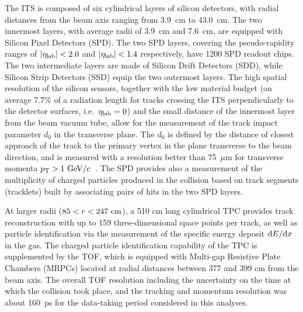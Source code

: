The ITS is composed of six cylindrical layers of silicon detectors, with radial distances from the beam axis ranging from 3.9~cm to 43.0~cm. 
The two innermost layers, with average radii of 3.9~cm and 7.6~cm, are equipped with Silicon Pixel Detectors (SPD). 
The two SPD layers, covering the pseudo-rapidity ranges of $|\eta_{\rm lab}|< 2.0$ and $|\eta_{\rm lab}|< 1.4$ respectively, have 1200 SPD readout chips.  
The two intermediate layers are made of Silicon Drift Detectors (SDD), while Silicon Strip Detectors (SSD) equip the two outermost layers. 
The high spatial resolution of the silicon sensors, together with the low material budget (on average 7.7\% of a radiation length for tracks crossing the ITS perpendicularly to the detector surfaces, i.e.\ $\eta_{\rm lab}=0$) and the small distance of the innermost layer from the beam vacuum tube, allow for the measurement of the track impact parameter $d_0$ in the transverse plane.
The $d_0$ is defined by the distance of closest approach of the track to the primary vertex in the plane transverse to the beam direction, and is measured with a resolution better than 75~$\mu$m for transverse momenta $p_{\mathrm{T}}>1~\mathrm{GeV}/c$~\cite{Aamodt:2010aa}.
The SPD provides also a measurement of the multiplicity of charged particles produced in the collision based on track segments (tracklets) built by associating pairs of hits in the two SPD layers.

At larger radii ($85<r<247~\mathrm{cm}$), a 510 cm long cylindrical TPC provides track reconstruction with up to 159 three-dimensional space points per track, as well as particle identification via the measurement of the specific energy deposit ${\rm d}E/{\rm d}x$ in the gas.
The charged particle identification capability of the TPC is supplemented by the TOF, which is equipped with Multi-gap Resistive Plate Chambers  (MRPCs) located at radial distances between 377 and 399 cm from the beam axis. The overall TOF resolution including the uncertainty on the time at which the collision took place, and the tracking and momentum resolution was about 160~ps for the data-taking period considered in this analyses. 


